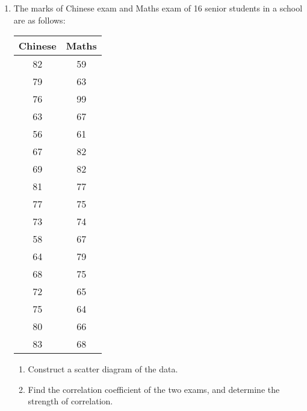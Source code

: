\documentclass{report}
\begin{document}
\begin{multicols}{2}
\begin{enumerate}
    \item The marks of Chinese exam and Maths exam of 16 senior students in a school are
          as follows:
          \begin{center}
            \begin{tabular}{|c|c|}
              \hline
              Chinese & Maths \\
              \hline
              82      & 59    \\
              79      & 63    \\
              76      & 99    \\
              63      & 67    \\
              56      & 61    \\
              67      & 82    \\
              69      & 82    \\
              81      & 77    \\
              77      & 75    \\
              73      & 74    \\
              58      & 67    \\
              64      & 79    \\
              68      & 75    \\
              72      & 65    \\
              75      & 64    \\
              80      & 66    \\
              83      & 68    \\
              \hline
            \end{tabular}
          \end{center}
          \begin{enumerate}
            \item Construct a scatter diagram of the data.
            \item Find the correlation coefficient of the two exams, and determine the strength
                  of correlation.
          \end{enumerate}


\end{enumerate}
\end{multicols}
\end{document}
